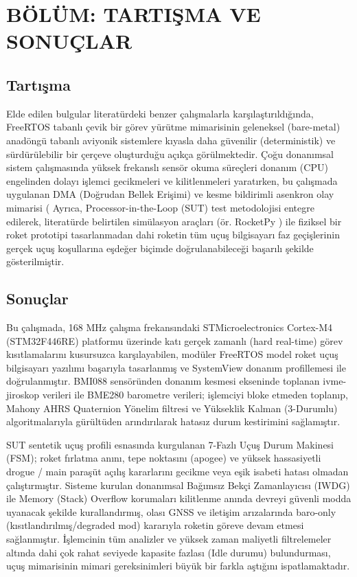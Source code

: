 \section{BÖLÜM: TARTIŞMA VE SONUÇLAR}
\label{bolum5}

\subsection{Tartışma}
\label{tartisma}

Elde edilen bulgular literatürdeki benzer çalışmalarla karşılaştırıldığında, FreeRTOS tabanlı çevik bir görev yürütme mimarisinin geleneksel (bare-metal) anadöngü tabanlı aviyonik sistemlere kıyasla daha güvenilir (deterministik) ve sürdürülebilir bir çerçeve oluşturduğu açıkça görülmektedir. Çoğu donanımsal sistem çalışmasında yüksek frekanslı sensör okuma süreçleri donanım (CPU) engelinden dolayı işlemci gecikmeleri ve kilitlenmeleri yaratırken, bu çalışmada uygulanan DMA (Doğrudan Bellek Erişimi) ve kesme bildirimli asenkron olay mimarisi (%
Ayrıca, Processor-in-the-Loop (SUT) test metodolojisi entegre edilerek, literatürde belirtilen simülasyon araçları (ör. RocketPy \cite{rocketpy}) ile fiziksel bir roket prototipi tasarlanmadan dahi roketin tüm uçuş bilgisayarı faz geçişlerinin gerçek uçuş koşullarına eşdeğer biçimde doğrulanabileceği başarılı şekilde gösterilmiştir.

\subsection{Sonuçlar}
\label{sonuclar}

Bu çalışmada, 168 MHz çalışma frekansındaki STMicroelectronics Cortex-M4 (STM32F446RE) platformu üzerinde katı gerçek zamanlı (hard real-time) görev kısıtlamalarını kusursuzca karşılayabilen, modüler FreeRTOS model roket uçuş bilgisayarı yazılımı başarıyla tasarlanmış ve SystemView donanım profillemesi ile doğrulanmıştır. 
BMI088 sensöründen donanım kesmesi ekseninde toplanan ivme-jiroskop verileri ile BME280 barometre verileri; işlemciyi bloke etmeden toplanıp, Mahony AHRS Quaternion Yönelim filtresi ve Yükseklik Kalman (3-Durumlu) algoritmalarıyla gürültüden arındırılarak hatasız durum kestirimini sağlamıştır. 

SUT sentetik uçuş profili esnasında kurgulanan 7-Fazlı Uçuş Durum Makinesi (FSM); roket fırlatma anını, tepe noktasını (apogee) ve yüksek hassasiyetli drogue / main paraşüt açılış kararlarını gecikme veya eşik isabeti hatası olmadan çalıştırmıştır. Sisteme kurulan donanımsal Bağımsız Bekçi Zamanlayıcısı (IWDG) ile Memory (Stack) Overflow korumaları kilitlenme anında devreyi güvenli modda uyanacak şekilde kurallandırmış, olası GNSS ve iletişim arızalarında baro-only (kısıtlandırılmış/degraded mod) kararıyla roketin göreve devam etmesi sağlanmıştır. İşlemcinin tüm analizler ve yüksek zaman maliyetli filtrelemeler altında dahi çok rahat seviyede kapasite fazlası (Idle durumu) bulundurması, uçuş mimarisinin mimari gereksinimleri büyük bir farkla aştığını ispatlamaktadır.

